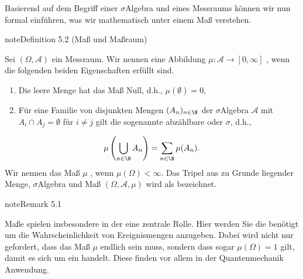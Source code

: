 \documentclass[letterpaper,10pt,english]{jupyterBook}
\begin{document}
\sphinxAtStartPar
Basierend auf dem Begriff einer \(\sigma\)\sphinxhyphen{}Algebra und eines Messraums können wir nun formal einführen, was wir mathematisch unter einem Maß verstehen.
\label{masstheorie/masstheorie:def:mass}
\begin{sphinxadmonition}{note}{Definition 5.2 (Maß und Maßraum)}



\sphinxAtStartPar
Sei \((\Omega, \mathcal{A})\) ein Messraum.
Wir nennen eine Abbildung \(\mu: \mathcal{A}\to [0, \infty]\) , wenn die folgenden beiden Eigenschaften erfüllt sind.
\begin{enumerate}
%
\item {} 
\sphinxAtStartPar
Die leere Menge hat das Maß Null, d.h., \(\mu(\emptyset) = 0\),

\item {} 
\sphinxAtStartPar
Für eine Familie von disjunkten Mengen \((A_n)_{n\in\N}\) der \(\sigma\)\sphinxhyphen{}Algebra \(\mathcal{A}\) mit \(A_i \cap A_j = \emptyset\) für \(i \neq j\) gilt die sogenannte abzählbare oder \(\sigma\)\sphinxhyphen{}, d.h.,

\end{enumerate}
\begin{equation*}
\begin{split}\mu\left( \bigcup_{n\in\N}A_n \right) = \sum_{n\in\N}\mu (A_n).\end{split}
\end{equation*}
\sphinxAtStartPar
Wir nennen das Maß \(\mu\) , wenn \(\mu(\Omega)<\infty\).
Das Tripel aus zu Grunde liegender Menge, \(\sigma\)\sphinxhyphen{}Algebra und Maß \((\Omega, \mathcal{A}, \mu)\) wird als  bezeichnet.
\end{sphinxadmonition}
\label{masstheorie/masstheorie:rem:wahrscheinlichkeitsmass}
\begin{sphinxadmonition}{note}{Remark 5.1}



\sphinxAtStartPar
Maße spielen insbesondere in der  eine zentrale Rolle.
Hier werden Sie die benötigt um die Wahrscheinlichkeit von Ereignismengen anzugeben.
Dabei wird nicht nur gefordert, dass das Maß \(\mu\) endlich sein muss, sondern dass sogar \(\mu(\Omega)=1\) gilt, damit es sich um ein  handelt.
Diese finden vor allem in der Quantenmechanik Anwendung.
\end{sphinxadmonition}
\end{document}
